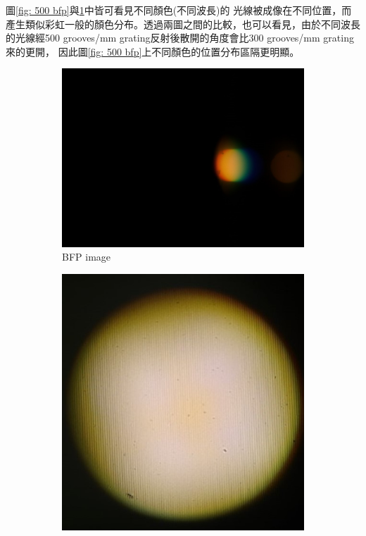 \documentclass[12pt]{article}
\begin{document}
圖\ref{fig: 500 bfp}與\ref{fig: 300 bfp}中皆可看見不同顏色(不同波長)的
光線被成像在不同位置，而產生類似彩虹一般的顏色分布。透過兩圖之間的比較，也可以看見，由於不同波長的光線經500 grooves/mm grating反射後散開的角度會比300 grooves/mm grating來的更開，
因此圖\ref{fig: 500 bfp}上不同顏色的位置分布區隔更明顯。

\begin{figure}[h]
    \centering
    \begin{subfigure}[b]{0.45\textwidth}
        \centering
        \includegraphics[width = \linewidth]{300bfp.jpeg}
        \caption{BFP image}
        \label{fig: 300 bfp}
    \end{subfigure}
    \begin{subfigure}[b]{0.45\textwidth}
        \centering
        \includegraphics[width = \linewidth]{300real.jpeg}

\end{subfigure}
\end{figure}
\end{document}

